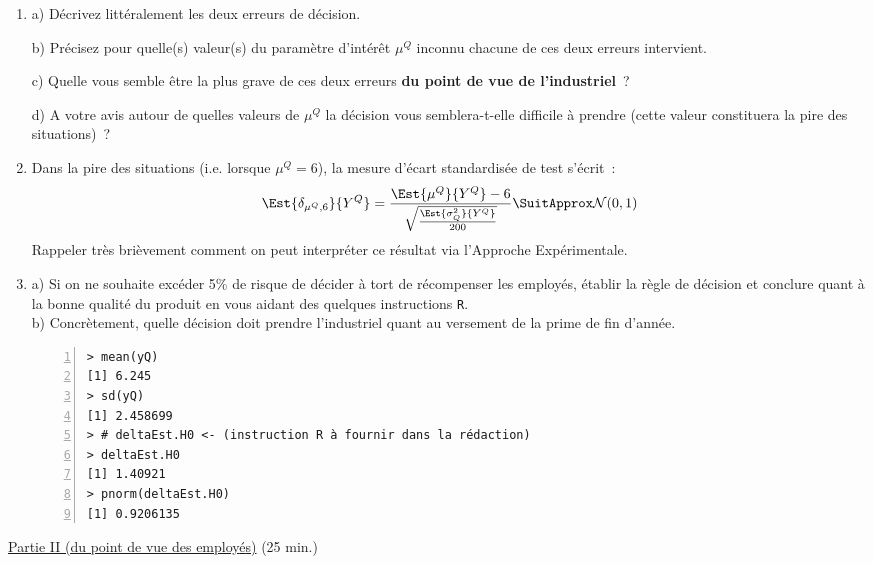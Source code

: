 \documentclass[10pt]{report}
\begin{document}
\begin{exercice}
\begin{enumerate}
 
\item a) D{\'e}crivez litt{\'e}ralement les deux erreurs de d{\'e}cision. 



b) Pr{\'e}cisez pour quelle(s) valeur(s) du param{\`e}tre d'int{\'e}r{\^e}t $\mu^Q$ inconnu chacune de ces deux erreurs intervient. 



c) Quelle vous semble {\^e}tre la plus grave de ces deux erreurs \textbf{du point de vue de l'industriel}~? 




d) A votre avis autour de quelles valeurs de $\mu^Q$ la d{\'e}cision vous semblera-t-elle difficile {\`a} prendre (cette valeur constituera la pire des situations)~? 





\item Dans la pire des situations (i.e. lorsque $\mu^Q=6$), la mesure d'{\'e}cart standardis{\'e}e de test s'{\'e}crit~: 
$$
\Est{\delta_{\mu^Q,6}}{Y^Q} = \frac{ \Est{\mu^Q}{Y^Q} - 6 }{ \sqrt{ \frac{\Est{\sigma_Q^2}{Y^Q}}{200}}} \SuitApprox \mathcal{N}(0,1)
$$
Rappeler tr{\`e}s bri{\`e}vement comment on peut interpr{\'e}ter ce r{\'e}sultat via l'Approche Exp{\'e}rimentale. 




\item a) Si on ne souhaite exc{\'e}der 5\% de risque de d{\'e}cider {\`a} tort de r{\'e}compenser les employ{\'e}s, {\'e}tablir la r{\`e}gle de d{\'e}cision et conclure quant {\`a} la bonne qualit{\'e} du produit en vous aidant des quelques instructions \texttt{R}. \\
b) Concr{\`e}tement, quelle d{\'e}cision doit prendre l'industriel quant au versement de la prime de fin d'ann{\'e}e.

\IndicR
\begin{Verbatim}[frame=leftline,fontfamily=tt,fontshape=n,numbers=left]
> mean(yQ)
[1] 6.245
> sd(yQ)
[1] 2.458699
> # deltaEst.H0 <- (instruction R à fournir dans la rédaction)
> deltaEst.H0
[1] 1.40921
> pnorm(deltaEst.H0)
[1] 0.9206135
\end{Verbatim}

 



\end{enumerate}

\noindent \underline{Partie II (du point de vue des employ{\'e}s)} (25 min.) \\


\end{exercice}
\end{document}
